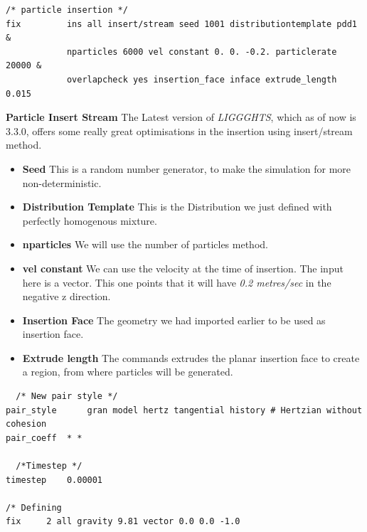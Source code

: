 \documentclass{tufte-book} %
\newcommand{\Li}{\textit{LIGGGHTS}\xspace}
\begin{document}
\begin{verbatim}
/* particle insertion */
fix         ins all insert/stream seed 1001 distributiontemplate pdd1 &
            nparticles 6000 vel constant 0. 0. -0.2. particlerate 20000 &
            overlapcheck yes insertion_face inface extrude_length 0.015                
\end{verbatim}
\textbf{Particle Insert Stream} The Latest version of \Li, which as of now is 3.3.0, offers some really great optimisations in the insertion using insert/stream method.
\begin{itemize}
\item \textbf{Seed} This is a random number generator, to make the simulation for more non-deterministic.
\item \textbf{Distribution Template} This is the Distribution we just defined with perfectly homogenous mixture.
\item \textbf{nparticles} We will use the number of particles method. 
\item \textbf{vel constant} We can use the velocity at the time of insertion. The input here is a vector. This one points that it will have \textit{0.2 metres/sec} in the negative z direction. 
\item \textbf{Insertion Face} The geometry we had imported earlier to be used as insertion face. 
\item \textbf{Extrude length} The commands extrudes the planar insertion face to create a region, from where particles will be generated. 
\end{itemize}

\begin{verbatim}
  /* New pair style */
pair_style      gran model hertz tangential history # Hertzian without cohesion
pair_coeff	* *

  /*Timestep */
timestep	0.00001

/* Defining 
fix		2 all gravity 9.81 vector 0.0 0.0 -1.0

\end{verbatim}
\end{document}
